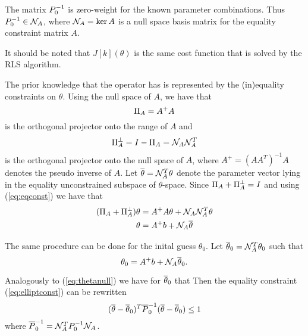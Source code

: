 \begin{assumption}
The matrix $P_0^{-1}$ is zero-weight for the known parameter combinations. Thus $P_0^{-1} \in \mathcal{N}_A$, where
$\mathcal{N}_A = \ker A$ is a null space basis matrix for the equality constraint matrix $A$.
\end{assumption}
It should be noted that 
$J[k](\theta)$ is the same cost function that is solved
by the RLS algorithm. \cite{islam_recursive_2019}

The prior knowledge that the operator has is represented by the (in)equality constraints
on $\theta$.
Using the null space of $A$, we have that
\begin{equation}
    \Pi_A = A^+A
\end{equation}
is the orthogonal projector onto the range of $A$ and
\begin{equation}
    \Pi_A^\perp = I - \Pi_A = \mathcal{N}_A\mathcal{N}_A^T
\end{equation}
is the orthogonal projector onto the null space of $A$,
where $A^+ = (AA^T)^{-1}A$ denotes the pseudo inverse of $A$.
Let $\overline{\theta} = \mathcal{N}_A^T\theta$ denote the parameter vector lying in the
equality unconstrained subspace of $\theta$-space. Since
$\Pi_A + \Pi_A^\perp = I$ and using (\ref{eq:eqconst}) we have that
\begin{align}
    (\Pi_A + \Pi_A^\perp)\theta &= A^+A\theta + \mathcal{N}_A\mathcal{N}_A^T\theta \notag \\
    \theta &= A^+b + \mathcal{N}_A\overline{\theta}
    \label{eq:thetanull}
\end{align}

The same procedure can be done for the inital guess $\theta_0$.
Let $\overline{\theta}_0 = \mathcal{N}_A^T\theta_0$ such that
\begin{equation}
    \theta_0 = A^+b + \mathcal{N}_A\overline{\theta}_0.
\end{equation}

Analogously to (\ref{eq:thetanull})
we have for $\overline{\theta}_0$ that
Then the equality constraint (\ref{eq:elliptconst}) can be rewritten
\begin{equation}
    (\overline{\theta}-\overline{\theta}_0)^T\overline{P}_0^{-1}(\overline{\theta}-\overline{\theta}_0) \leq 1
\end{equation}
where $\overline{P}_0^{-1} = \mathcal{N}_A^TP_0^{-1}\mathcal{N}_A$.

